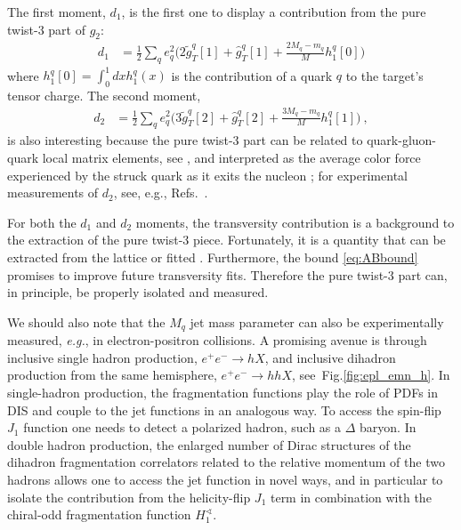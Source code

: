 \documentclass[preprintnumbers,floatfix,nofootinbib]{revtex4}
\newcommand{\eg}{{\em e.g.}}
\newcommand{\mj}{M_q}
\newcommand{\mq}{m_q}
\begin{document}
The first moment, $d_1$, is the first one to display a contribution from the pure twist-3 part of $g_2$:
\begin{align}
  d_1 & = \frac12 \sum_q e_q^2 \bigg( 2 \tilde g_T^q[1] + \hat g_T^q[1] 
    + \frac{2\mj-\mq}{M} h_1^q[0] \bigg)
\label{e:d1}
\end{align}
where $h_1^q[0] = \int_0^1 dx h_1^q(x)$ is the contribution of a quark $q$ to the target's tensor charge. The second moment,
\begin{align}
  d_2 & = \frac12 \sum_q e_q^2 \bigg( 3 \tilde g_T^q[2] + \hat g_T^q[2] 
    + \frac{3\mj-\mq}{M} h_1^q[1] \bigg) \ ,
\end{align}
is also interesting because the pure twist-3 part can be related to quark-gluon-quark local matrix elements, see \cite{Jaffe:1996zw}, and
interpreted as the average color force experienced by the struck quark as
it exits the nucleon \cite{Burkardt:2012sd}; for experimental
measurements of $d_2$, see, e.g., Refs.~\cite{Anthony:2002hy,Slifer:2008xu,Solvignon:2013yun,Posik:2014usi,Flay:2016wie}. 

For both the $d_1$ and $d_2$ moments, the transversity contribution is a background to the extraction of the pure twist-3 piece. Fortunately, it is a quantity that can be extracted from the lattice
\cite{Green:2012ej,Bali:2014nma,Bhattacharya:2015wna,Abdel-Rehim:2015owa,Bhattacharya:2016zcn} 
or fitted \cite{Radici:2015mwa,Anselmino:2015sxa,Kang:2015msa}.
Furthermore, the bound
\eqref{eq:ABbound} promises to improve future transversity fits. Therefore the pure twist-3 part can, in principle, be properly isolated and measured.


We should also note that the $\mj$ jet mass parameter can
also be experimentally measured, \eg, in electron-positron collisions.
A promising avenue is through inclusive single hadron production, $e^+ e^- \to h X$, and inclusive dihadron 
production from the same hemisphere, $e^+ e^- \to h h X$, see~Fig.\ref{fig:epl_emn_h}.
In single-hadron production, the fragmentation functions 
play the role of PDFs in DIS and couple to the jet functions
in an analogous way. To access the spin-flip $J_1$ function one needs to detect a polarized hadron, such as a $\Delta$ baryon. 
In double hadron production, the enlarged number of Dirac structures
of the dihadron fragmentation correlators related to the relative momentum of the two hadrons \cite{Bacchetta:2002ux,Bacchetta:2003vn} allows one to access
the jet function in novel ways, and in particular to isolate the
contribution from the helicity-flip $J_1$ term in combination with the
chiral-odd fragmentation function $H_1^{\sphericalangle}$. 
\end{document}
